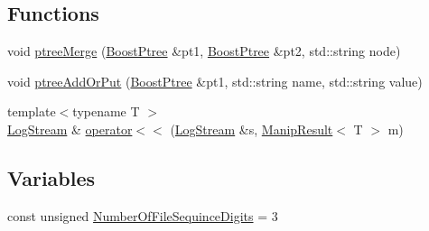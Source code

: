 \subsection*{Functions}
\begin{DoxyCompactItemize}
\item 
void \hyperlink{a00089_a36b9e65a0a3786bd85198e4530c65bf9}{ptree\-Merge} (\hyperlink{a00048_ab36820650b8e0db36402aea80485633c}{Boost\-Ptree} \&pt1, \hyperlink{a00048_ab36820650b8e0db36402aea80485633c}{Boost\-Ptree} \&pt2, std\-::string node)
\item 
void \hyperlink{a00089_a6bb122f9d1f472c12420a2ec59fdc287}{ptree\-Add\-Or\-Put} (\hyperlink{a00048_ab36820650b8e0db36402aea80485633c}{Boost\-Ptree} \&pt1, std\-::string name, std\-::string value)
\item 
{\footnotesize template$<$typename T $>$ }\\\hyperlink{a00031}{Log\-Stream} \& \hyperlink{a00089_a7a056a2a9cc68e577ced326d1ebf86c1}{operator$<$$<$} (\hyperlink{a00031}{Log\-Stream} \&s, \hyperlink{a00033}{Manip\-Result}$<$ T $>$ m)
\end{DoxyCompactItemize}
\subsection*{Variables}
\begin{DoxyCompactItemize}
\item 
const unsigned \hyperlink{a00089_a743621016edf95f7afda64b2da3bb576}{Number\-Of\-File\-Sequince\-Digits} = 3
\end{DoxyCompactItemize}


